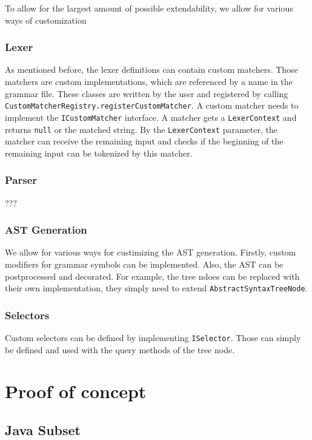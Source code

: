 To allow for the largest amount of possible extendability, we allow for various ways of customization

\subsubsection{Lexer}

As mentioned before, the lexer definitions can contain custom matchers. Those matchers are custom implementations, which are referenced by a name in the grammar file. These classes are written by the user and registered by calling \verb|CustomMatcherRegistry.registerCustomMatcher|. A custom matcher needs to implement the \verb|ICustomMatcher| interface. A matcher gets a \verb|LexerContext| and returns \verb|null| or the matched string. By the \verb|LexerContext| parameter, the matcher can receive the remaining input and checks if the beginning of the remaining input can be tokenized by this matcher.

\subsubsection{Parser}

???


\subsubsection{AST Generation}

We allow for various ways for custimizing the AST generation. Firstly, custom modifiers for grammar symbols can be implemented. Also, the AST can be postprocessed and decorated. For example, the tree ndoes can be replaced with their own implementation, they simply need to extend \verb|AbstractSyntaxTreeNode|.

\subsubsection{Selectors}

Custom selectors can be defined by implementing \verb|ISelector|. Those can simply be defined and used with the query methods of the tree node.

\section{Proof of concept}

\subsection{Java Subset}

